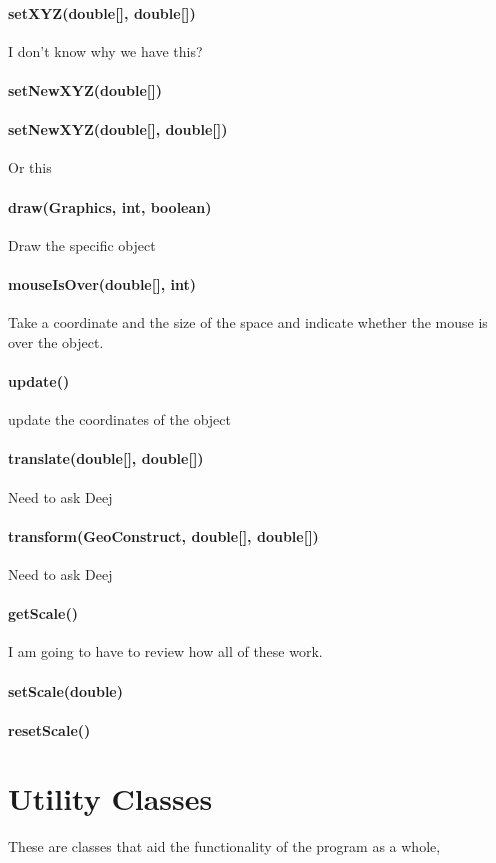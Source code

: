 \documentclass[a4paper,10pt]{report}
\begin{document}
\subsubsection{setXYZ(double[], double[])} I don't know why we have this?
\subsubsection{setNewXYZ(double[])}
\subsubsection{setNewXYZ(double[], double[])} Or this
\subsubsection{draw(Graphics, int, boolean)} Draw the specific object
\subsubsection{mouseIsOver(double[], int)} Take a coordinate and the size of the space and indicate whether the mouse is over the object.
\subsubsection{update()} update the coordinates of the object
\subsubsection{translate(double[], double[])}  Need to ask Deej
\subsubsection{transform(GeoConstruct, double[], double[])} Need to ask Deej
\subsubsection{getScale()}  I am going to have to review how all of these work.
\subsubsection{setScale(double)}
\subsubsection{resetScale()}
\chapter{Utility Classes}
  These are classes that aid the functionality of the program as a whole, 
\end{document}
